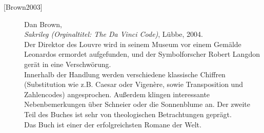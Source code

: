 \begin{refsegment}
\begin{description}
\item[\textrm{[Brown2003]}] 
    Dan Brown, \\
    {\em Sakrileg (Orginaltitel: The Da Vinci Code)}, Lübbe, 2004. \\
    Der Direktor des Louvre wird in seinem Museum vor einem Gemälde Leonardos
    ermordet aufgefunden, und der Symbolforscher Robert Langdon gerät in eine
    Verschwörung.\\
    Innerhalb der Handlung werden verschiedene klassische Chiffren (Substitution
    wie z.B. Caesar oder Vigen\`ere, sowie Transposition und Zahlencodes)
    angesprochen. Außerdem klingen interessante Nebenbemerkungen über
    Schneier oder die Sonnenblume an.
    Der zweite Teil des Buches ist sehr von theologischen Betrachtungen
    geprägt. \\
    Das Buch ist einer der erfolgreichsten Romane der Welt.\\





\end{description}
\end{refsegment}
